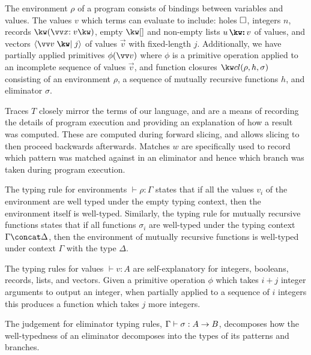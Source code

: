 

The environment $\rho$ of a program consists of bindings between variables and values. The values $v$ which terms can evaluate to include: holes $\square$, integers $n$, records $\exRec{\vec{\bind{x}{v}}}$, empty $\exNil$ and non-empty lists $\exCons{u}{v}$ of values, and vectors $\exVecVal{\vec{v}}{j}$ of values $\vec{v}$ with fixed-length $j$. Additionally, we have partially applied primitives $\exPrimOp{\phi}{\vec{v}}$ where $\phi$ is a primitive operation applied to an incomplete sequence of values $\vec{v}$, and function closures $\exClosure{\rho}{h}{\sigma}$ consisting of an environment $\rho$, a sequence of mutually recursive functions $h$, and eliminator $\sigma$. 



Traces $T$ closely mirror the terms of our language, and are a means of recording the details of program execution and providing an explanation of how a result was computed. These are computed during forward slicing, and allows slicing to then proceed backwards afterwards. Matches $w$ are specifically used to record which pattern was matched against in an eliminator and hence which branch was taken during program execution. 



The typing rule for environments $\vdash \rho: \Gamma$ states that if all the values $v_i$ of the environment are well typed under the empty typing context, then the environment itself is well-typed. Similarly, the typing rule for mutually recursive functions states that if all functions $\sigma_i$ are well-typed under the typing context $\Gamma \concat \Delta$, then the environment of mutually recursive functions is well-typed under context $\Gamma$ with the type $\Delta$.

The typing rules for values $\vdash v: A$ are self-explanatory for integers, booleans, records, lists, and vectors. Given a primitive operation $\phi$ which takes $i+j$ integer arguments to output an integer, when partially applied to a sequence of $i$ integers this produces a function which takes $j$ more integers.



The judgement for eliminator typing rules, $\Gamma \vdash \sigma: {A}\rightarrow{B}$, decomposes how the well-typedness of an eliminator decomposes into the types of its patterns and branches. 


